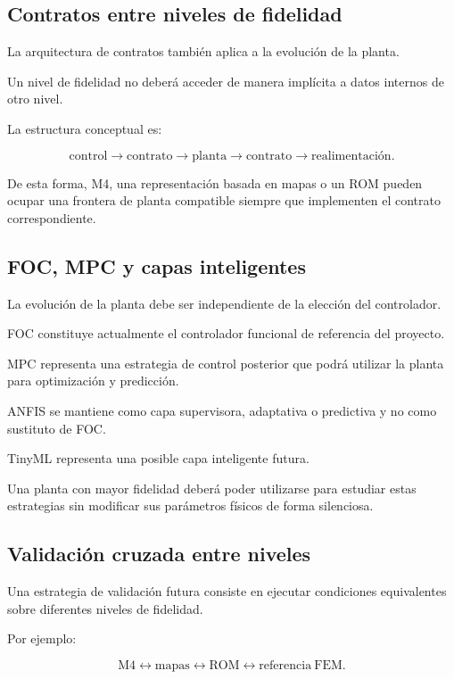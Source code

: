 \subsection{Contratos entre niveles de fidelidad}

La arquitectura de contratos también aplica a la evolución de la planta.

Un nivel de fidelidad no deberá acceder de manera implícita a datos internos de otro nivel.

La estructura conceptual es:

\begin{equation}
\mathrm{control}
\rightarrow
\mathrm{contrato}
\rightarrow
\mathrm{planta}
\rightarrow
\mathrm{contrato}
\rightarrow
\mathrm{realimentación}.
\end{equation}

De esta forma, M4, una representación basada en mapas o un ROM pueden ocupar una frontera de planta compatible siempre que implementen el contrato correspondiente.

\subsection{FOC, MPC y capas inteligentes}

La evolución de la planta debe ser independiente de la elección del controlador.

FOC constituye actualmente el controlador funcional de referencia del proyecto.

MPC representa una estrategia de control posterior que podrá utilizar la planta para optimización y predicción.

ANFIS se mantiene como capa supervisora, adaptativa o predictiva y no como sustituto de FOC.

TinyML representa una posible capa inteligente futura.

Una planta con mayor fidelidad deberá poder utilizarse para estudiar estas estrategias sin modificar sus parámetros físicos de forma silenciosa.

\subsection{Validación cruzada entre niveles}

Una estrategia de validación futura consiste en ejecutar condiciones equivalentes sobre diferentes niveles de fidelidad.

Por ejemplo:

\begin{equation}
\mathrm{M4}
\leftrightarrow
\mathrm{mapas}
\leftrightarrow
\mathrm{ROM}
\leftrightarrow
\mathrm{referencia\ FEM}.
\end{equation}

